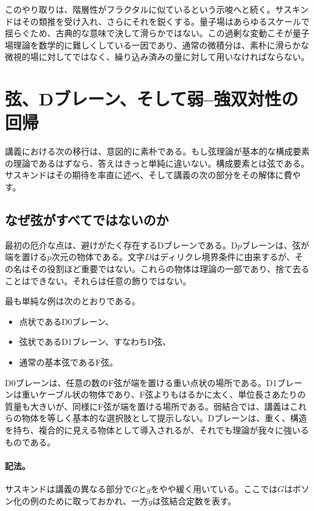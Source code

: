 このやり取りは、階層性がフラクタルに似ているという示唆へと続く。サスキンドはその類推を受け入れ、さらにそれを鋭くする。量子場はあらゆるスケールで揺らぐため、古典的な意味で決して滑らかではない。この過剰な変動こそが量子場理論を数学的に難しくしている一因であり、通常の微積分は、素朴に滑らかな微視的場に対してではなく、繰り込み済みの量に対して用いなければならない。

\section{弦、Dブレーン、そして弱--強双対性の回帰}

講義における次の移行は、意図的に素朴である。もし弦理論が基本的な構成要素の理論であるはずなら、答えはきっと単純に違いない。構成要素とは弦である。サスキンドはその期待を率直に述べ、そして講義の次の部分をその解体に費やす。

\subsection{なぜ弦がすべてではないのか}

最初の厄介な点は、避けがたく存在するDブレーンである。D\(p\)ブレーンは、弦が端を置ける\(p\)次元の物体である。文字\(D\)はディリクレ境界条件に由来するが、その名はその役割ほど重要ではない。これらの物体は理論の一部であり、捨て去ることはできない。それらは任意の飾りではない。

最も単純な例は次のとおりである。
\begin{itemize}
\item 点状であるD0ブレーン、
\item 弦状であるD1ブレーン、すなわちD弦、
\item 通常の基本弦であるF弦。
\end{itemize}
D0ブレーンは、任意の数のF弦が端を置ける重い点状の場所である。D1ブレーンは重いケーブル状の物体であり、F弦よりもはるかに太く、単位長さあたりの質量も大きいが、同様にF弦が端を置ける場所である。弱結合では、講義はこれらの物体を等しく基本的な選択肢として提示しない。Dブレーンは、重く、構造を持ち、複合的に見える物体として導入されるが、それでも理論が我々に強いるものである。


\paragraph{記法。}
サスキンドは講義の異なる部分で\(G\)と\(g\)をやや緩く用いている。ここでは\(G\)はボソン化の例のために取っておかれ、一方\(g\)は弦結合定数を表す。

